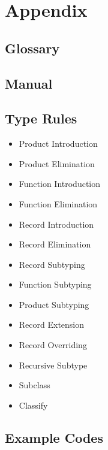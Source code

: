 
\appendix
\part*{Appendix}

\chapter{Glossary}
\printnomenclature

\chapter{Manual}


\chapter{Type Rules}
\begin{itemize}
\item Product Introduction
\item Product Elimination
\item Function Introduction
\item Function Elimination
\item Record Introduction
\item Record Elimination
\item Record Subtyping
\item Function Subtyping
\item Product Subtyping
\item Record Extension
\item Record Overriding
\item Recursive Subtype
\item Subclass
\item Classify
\end{itemize}

\chapter{Example Codes}
\label{ctr:exampleCode}


